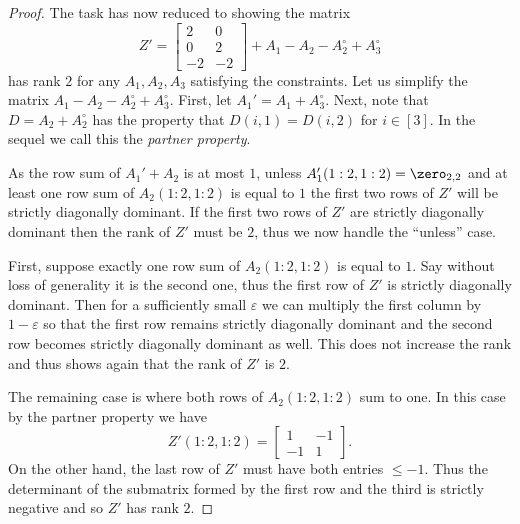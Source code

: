 \begin{proof}
The task has now reduced to showing the matrix
\[
Z'=
\begin{bmatrix}
2 & 0 \\
0 & 2 \\
-2 & -2
\end{bmatrix}
+ A_1 - A_2 - A_2^\circ + A_3^\circ
\]
has rank $2$ for any $A_1, A_2, A_3$ satisfying the constraints.  Let us simplify the matrix $A_1 - A_2 - A_2^\circ + A_3^\circ$.
First, let $A_1' = A_1 + A_3^\circ$.  Next, note that $D = A_2 + A_2^\circ$ has the property that $D(i,1) = D(i,2)$ for $i \in [3]$.
In the sequel we call this the \emph{partner property}.

As the row sum of $A_1' + A_2$ is at most $1$, unless $A_1'(1:2,1:2) = \zero_{2,2}$ and at least one row sum of $A_2(1:2,1:2)$ is equal to $1$ the
first two rows of $Z'$ will be strictly diagonally dominant.  If the first two rows of $Z'$ are strictly diagonally dominant then the
rank of $Z'$ must be $2$, thus we now handle the ``unless'' case.

First, suppose exactly one row sum of $A_2(1:2,1:2)$ is equal to $1$. Say without loss of generality it is the second one, thus
the first row of $Z'$ is strictly diagonally dominant.  Then for a sufficiently small $\varepsilon$ we can multiply the first column by $1-\varepsilon$
so that the first row remains strictly diagonally dominant and the second row becomes strictly diagonally dominant as well.  This
does not increase the rank and thus shows again that the rank of $Z'$ is $2$.

The remaining case is where both rows of $A_2(1:2,1:2)$ sum to one.  In this case by the partner property we have
\[
Z'(1:2,1:2) = \begin{bmatrix}
1&-1\\
-1&1
\end{bmatrix} .
\]
On the other hand, the last row of $Z'$ must have both entries $\le -1$.  Thus the determinant of the submatrix formed by the first row and the third is strictly negative and so $Z'$
has rank $2$.
\end{proof}



